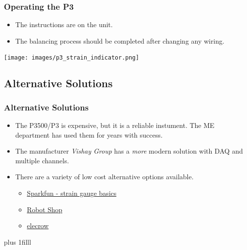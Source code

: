 \documentclass[fleqn]{beamer} %
\newcommand{\sectionIIIsubsectionIIItitle}{Operating the P3}
\newcommand{\sectionIIIsubsectionIVtitle}{Alternative Solutions}
\newcommand{\btVFill}{\vskip0pt plus 1filll}
\begin{document}
			\begin{frame}[containsverbatim]
				\frametitle{\sectionIIIsubsectionIIItitle}\scriptsize

				\begin{multicols}{2}

					\begin{itemize}

						\item The instructions are on the unit. 

						\item The balancing process should be completed after changing any wiring. \vspace{25mm}

					\end{itemize}



					\texttt{[image: images/p3\_strain\_indicator.png]}

				\end{multicols}

				
				

			\end{frame}

			

		\subsection{\sectionIIIsubsectionIVtitle}\label{sectionIIIsubsectionIV}	
		
		\begin{frame} \scriptsize
		\frametitle{\sectionIIIsubsectionIVtitle}
		\bigskip


			\begin{itemize}

			\item The P3500/P3 is expensive, but it is a reliable instument. The ME department has used them for years with success. \vspc

			\item The manufacturer {\it Vishay Group} has a {\it more} modern solution with DAQ and multiple channels. \vspc

			\item There are a variety of low cost alternative options available.

			\begin{itemize}
			\item \href{https://learn.sparkfun.com/tutorials/getting-started-with-load-cells/strain-gauge-basics}{Sparkfun - strain gauge basics}
			\item \href{https://www.robotshop.com/en/strain-gauge-load-cell-amplifier-shield-2ch.html}{Robot Shop}

			\item \href{https://www.elecrow.com/strain-gauge-module-p-735.html}{elecrow}
			\end{itemize}

			\end{itemize}


		\btVFill

		\end{frame}
	
\end{document}
